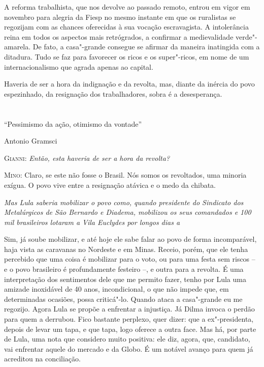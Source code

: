 A reforma trabalhista, que nos devolve ao passado remoto, entrou em
vigor em novembro para alegria da Fiesp no mesmo instante em que os
ruralistas se regozijam com as chances oferecidas à sua vocação
escravagista. A intolerância reina em todos os aspectos mais
retrógrados, a confirmar a medievalidade verde"-amarela. De fato, a
casa"-grande consegue se afirmar da maneira inatingida com a ditadura.
Tudo se faz para favorecer os ricos e os super"-ricos, em nome de um
internacionalismo que agrada apenas ao capital.

Haveria de ser a hora da indignação e da revolta, mas, diante da inércia
do povo espezinhado, da resignação dos trabalhadores, sobra é a
desesperança.



\chapter*{}

\epigraph{``Pessimismo da ação, otimismo da vontade''}{Antonio Gramsci}


\parindent0pt
\parskip4pt

\textsc{Gianni:}
\itshape
 Então, esta haveria de ser a hora da revolta?

\normalfont\textsc{Mino:} Claro, se este não fosse o Brasil. Nós somos os
revoltados, uma minoria exígua. O povo vive entre a resignação atávica e
o medo da chibata.

\itshape
Mas Lula saberia mobilizar o povo como, quando
presidente do Sindicato dos Metalúrgicos de São Bernardo e Diadema,
mobilizou os seus comandados e 100 mil brasileiros lotaram a Vila
Euclydes por longos dias a%

\normalfont 
\normalfont
Sim, já soube mobilizar, e até hoje ele sabe falar ao
povo de forma incomparável, haja vista as caravanas no Nordeste e em
Minas. Receio, porém, que ele tenha percebido que uma coisa é mobilizar
para o voto, ou para uma festa sem riscos -- e o povo brasileiro é
profundamente festeiro --, e outra para a revolta. É uma interpretação
dos sentimentos dele que me permito fazer, tenho por Lula uma amizade
inoxidável de 40 anos, incondicional, o que não impede que, em
determinadas ocasiões, possa criticá"-lo. Quando ataca a casa"-grande eu
me regozijo. Agora Lula se propõe a enfrentar a injustiça. Já Dilma
invoca o perdão para quem a derrubou. Fico bastante perplexo, quer
dizer: que a ex"-presidenta, depois de levar um tapa, e que tapa, logo
oferece a outra face. Mas há, por parte de Lula, uma nota que considero
muito positiva: ele diz, agora, que, candidato, vai enfrentar aquele do
mercado e da Globo. É um notável avanço para quem já acreditou na
conciliação.

